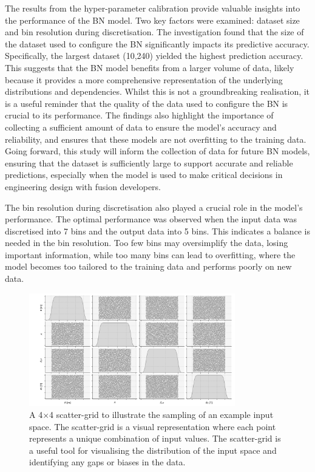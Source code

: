 \documentclass[journal]{IEEEtran}
\begin{document}
The results from the hyper-parameter calibration provide valuable insights into the performance of the BN model. Two key factors were examined: dataset size and bin resolution during discretisation. The investigation found that the size of the dataset used to configure the BN significantly impacts its predictive accuracy. Specifically, the largest dataset (10,240) yielded the highest prediction accuracy. This suggests that the BN model benefits from a larger volume of data, likely because it provides a more comprehensive representation of the underlying distributions and dependencies. Whilst this is not a groundbreaking realisation, it is a useful reminder that the quality of the data used to configure the BN is crucial to its performance. The findings also highlight the importance of collecting a sufficient amount of data to ensure the model's accuracy and reliability, and ensures that these models are not overfitting to the training data. Going forward, this study will inform the collection of data for future BN models, ensuring that the dataset is sufficiently large to support accurate and reliable predictions, especially when the model is used to make critical decisions in engineering design with fusion developers.

The bin resolution during discretisation also played a crucial role in the model's performance. The optimal performance was observed when the input data was discretised into 7 bins and the output data into 5 bins. This indicates a balance is needed in the bin resolution. Too few bins may oversimplify the data, losing important information, while too many bins can lead to overfitting, where the model becomes too tailored to the training data and performs poorly on new data.

\begin{figure}[t]
    \centering
    \includegraphics[width=0.8\textwidth]{figures/TE_results/4x4scatter_inputs_marchdata.png}
    \caption{\small A 4$\times$4 scatter-grid to illustrate the sampling of an example input space. The scatter-grid is a visual representation where each point represents a unique combination of input values. The scatter-grid is a useful tool for visualising the distribution of the input space and identifying any gaps or biases in the data.}\label{fig:scatter_sampling}
\end{figure}
\end{document}
